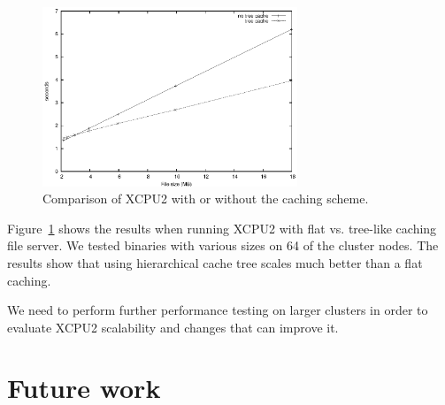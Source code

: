 \documentclass[10pt,conference,letterpaper]{IEEEtran}
\begin{document}
\begin{figure}[h]
\begin{center}
\includegraphics[width=3in, keepaspectratio]{results3.eps}
\end{center}
\caption{Comparison of XCPU2 with or without the caching scheme.}
\label{fig:XCPU-results3}
\end{figure}

Figure~\ref{fig:XCPU-results3} shows the results when running XCPU2 with
flat vs. tree-like caching file server. We tested binaries with various
sizes on 64 of the cluster nodes. The results show that using hierarchical
cache tree scales much better than a flat caching.

We need to perform further performance testing on larger clusters in order
to evaluate XCPU2 scalability and changes that can improve it.

\section{Future work}





\end{document}
